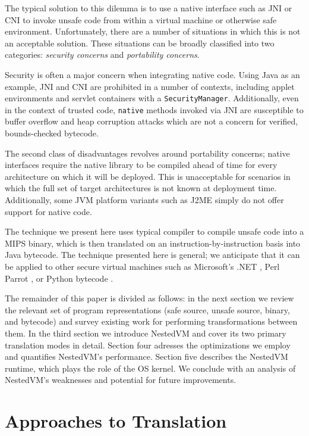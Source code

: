 \documentclass{acmconf}
\begin{document}
The typical solution to this dilemma is to use a native interface such
as JNI \cite{jni} or CNI \cite{cni} to invoke unsafe code from within a
virtual machine or otherwise safe environment.  Unfortunately, there
are a number of situations in which this is not an acceptable
solution.  These situations can be broadly classified into two
categories: {\it security concerns} and {\it portability concerns}.

Security is often a major concern when integrating native code.  Using
Java as an example, JNI and CNI are prohibited in a number of
contexts, including applet environments and servlet containers with a
{\tt SecurityManager}.  Additionally, even in the context of trusted
code, {\tt native} methods invoked via JNI are susceptible to buffer
overflow and heap corruption attacks which are not a concern for
verified, bounds-checked bytecode.

The second class of disadvantages revolves around portability
concerns; native interfaces require the native library to be compiled
ahead of time for every architecture on which it will be deployed.
This is unacceptable for scenarios in which the full set of target
architectures is not known at deployment time.  Additionally, some JVM
platform variants such as J2ME \cite{j2me} simply do not offer support
for native code.

The technique we present here uses typical compiler to compile unsafe
code into a MIPS binary, which is then translated on an
instruction-by-instruction basis into Java bytecode.  The technique
presented here is general; we anticipate that it can be applied to
other secure virtual machines such as Microsoft's .NET \cite{msil},
Perl Parrot \cite{parrot}, or Python bytecode \cite{python}.

The remainder of this paper is divided as follows: in the next section
we review the relevant set of program representations (safe source,
unsafe source, binary, and bytecode) and survey existing work for
performing transformations between them.  In the third section we
introduce NestedVM and cover its two primary translation modes in
detail.  Section four adresses the optimizations we employ and
quantifies NestedVM's performance.  Section five describes the
NestedVM runtime, which plays the role of the OS kernel.  We conclude
with an analysis of NestedVM's weaknesses and potential for future
improvements.


\section{Approaches to Translation}
\end{document}
